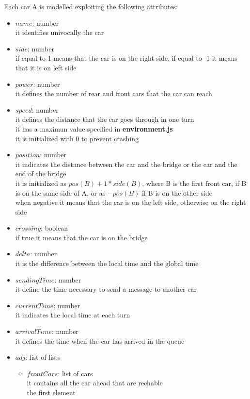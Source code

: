 Each car A is modelled exploiting the following attributes:
\begin{itemize}
    \item $name$: number\\ it identifies univocally the car
    \item $side$: number\\ if equal to 1 means that the car is on the right side, 
    if equal to -1 it means that it is on left side
    \item $power$: number\\ it defines the number of rear and front cars that the car can reach
    \item $speed$: number\\ it defines the distance that the car goes through in one turn\\
    it has a maximun value specified in \textbf{environment.js}\\
    it is initialized with 0 to prevent crashing 
    \item $position$: number \\it indicates the distance between the car and the bridge or the car and the end of the
    bridge\\it is initialized as $pos(B)+1*side(B)$, where B is the first front car, if B is on the same side of A, or
    as $-pos(B)$ if B is on the other side\\ when negative it means that the car is on the left side, otherwise on the right side
    \item $crossing$: boolean\\ if true it means that the car is on the bridge
    \item $delta$: number\\ it is the difference between the local time and the global time
    \item $sendingTime$: number\\ it define the time necessary to send a message to another car
    \item $currentTime$: number\\ it indicates the local time at each turn
    \item $arrivalTime$: number\\ it defines the time when the car has arrived in the queue
    \item $adj$: list of lists
    \begin{itemize}
        \item $frontCars$: list of cars\\ it contains all the car ahead that are rechable\\ the first element

\end{itemize}
\end{itemize}
